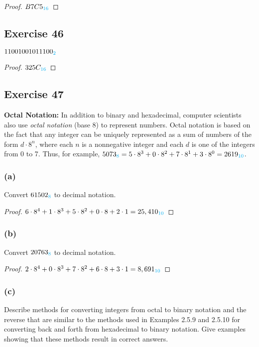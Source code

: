 \documentclass[14pt]{extarticle}
\newcommand{\base}[1]{{\color{cyan}#1}}
\begin{document}
\begin{proof}
    $B7C5_\base{16}$
\end{proof}

\subsection{Exercise 46}
$11001001011100_\base{2}$

\begin{proof}
    $325C_\base{16}$
\end{proof}

\subsection{Exercise 47}
{\bf Octal Notation:} In addition to binary and hexadecimal, computer scientists also use {\it octal notation} (base 8) to
represent numbers. Octal notation is based on the fact that any integer can be uniquely represented as a sum of numbers of the form $d \cdot 8^n$, where each $n$ is a nonnegative integer and each $d$ is one of the integers from 0 to 7. Thus, for example, $5073_\base{8} = 5 \cdot 8^3 + 0 \cdot 8^2 + 7 \cdot 8^1 + 3
    \cdot 8^0 = 2619_\base{10}$.

\subsubsection{(a)}
Convert $61502_\base{8}$ to decimal notation.

\begin{proof}
    $6\cdot8^4 + 1\cdot8^3 + 5\cdot8^2 + 0\cdot8 + 2\cdot1 = 25,410_\base{10}$
\end{proof}

\subsubsection{(b)}
Convert $20763_\base{8}$ to decimal notation.

\begin{proof}
    $2\cdot8^4 + 0\cdot8^3 + 7\cdot8^2 + 6\cdot8 + 3\cdot1 = 8,691_\base{10}$
\end{proof}

\subsubsection{(c)}
Describe methods for converting integers from octal to binary notation and the reverse that are similar to the methods used in Examples 2.5.9 and 2.5.10 for converting back and forth from hexadecimal to binary notation. Give examples showing that these methods result in correct answers.
\end{document}
